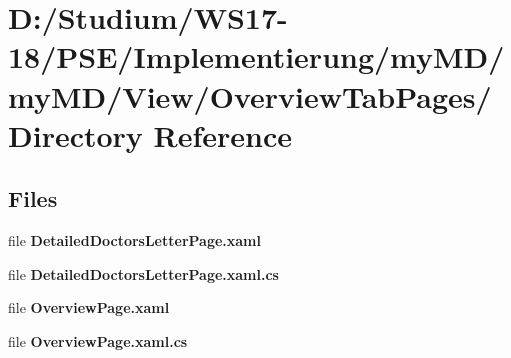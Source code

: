 \hypertarget{dir_D_3A_2FStudium_2FWS17_2D18_2FPSE_2FImplementierung_2FmyMD_2FmyMD_2FView_2FOverviewTabPages_2F}{
\section{D:/Studium/WS17-18/PSE/Implementierung/my\-MD/my\-MD/View/Overview\-Tab\-Pages/ Directory Reference}
\label{dir_D_3A_2FStudium_2FWS17_2D18_2FPSE_2FImplementierung_2FmyMD_2FmyMD_2FView_2FOverviewTabPages_2F}
}


\subsection*{Files}
\begin{CompactItemize}
\item 
file {\bf Detailed\-Doctors\-Letter\-Page.xaml}
\item 
file {\bf Detailed\-Doctors\-Letter\-Page.xaml.cs}
\item 
file {\bf Overview\-Page.xaml}
\item 
file {\bf Overview\-Page.xaml.cs}
\end{CompactItemize}
